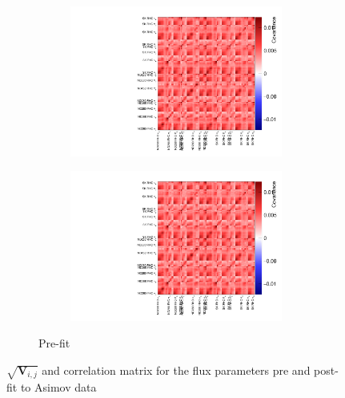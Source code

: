 \begin{figure}[h]
\begin{subfigure}[t]{\textwidth}
\begin{subfigure}[t]{0.49\textwidth}
	\includegraphics[width=\textwidth, trim={0mm 0mm 0mm 0mm}, clip,page=2]{figures/mach3/inputs/flux_covariance_banff_13av2.pdf}
\end{subfigure}
\begin{subfigure}[t]{0.49\textwidth}
	\includegraphics[width=\textwidth, trim={0mm 0mm 0mm 0mm}, clip,page=3]{figures/mach3/inputs/flux_covariance_banff_13av2.pdf}
\end{subfigure}
\caption{Pre-fit}
\end{subfigure}
	\caption{$\sqrt{\mathbf{V}_{i,j}}$ and correlation matrix for the flux parameters pre and post-fit to Asimov data}
	\label{fig:asimov_flux_corr}
\end{figure}

